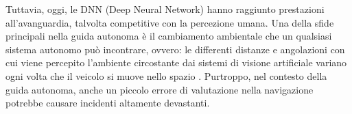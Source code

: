 \documentclass[14pt]{extarticle}
\begin{document}
Tuttavia, oggi, le DNN (Deep Neural Network) hanno raggiunto prestazioni all'avanguardia, talvolta competitive con la percezione umana.
Una della sfide principali nella guida autonoma è il cambiamento ambientale che un qualsiasi sistema autonomo può incontrare, ovvero: le
differenti distanze e angolazioni con cui viene percepito l'ambiente circostante dai sistemi di visione artificiale variano ogni volta che il veicolo si
muove nello spazio \cite{eykholt2018robust} .
Purtroppo, nel contesto della guida autonoma, anche un piccolo errore
di valutazione nella navigazione potrebbe causare incidenti altamente
devastanti.

\end{document}
